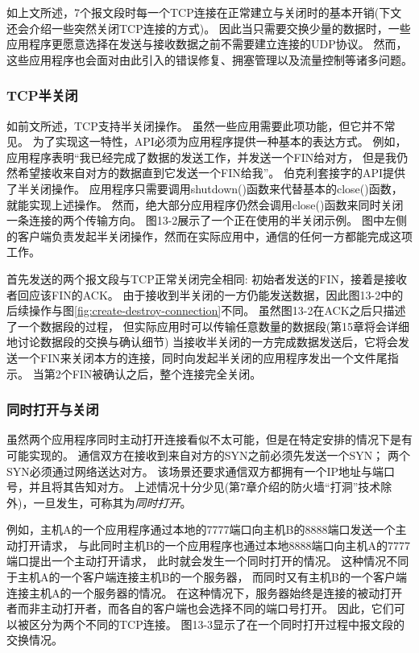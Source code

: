 \documentclass{../main.tex}{subfiles}
\begin{document}
如上文所述，7个报文段时每一个TCP连接在正常建立与关闭时的基本开销(下文还会介绍一些突然关闭TCP连接的方式)。
因此当只需要交换少量的数据时，一些应用程序更愿意选择在发送与接收数据之前不需要建立连接的UDP协议。
然而，这些应用程序也会面对由此引入的错误修复、拥塞管理以及流量控制等诸多问题。


\subsubsection{TCP半关闭}
如前文所述，TCP支持半关闭操作。
虽然一些应用需要此项功能，但它并不常见。
为了实现这一特性，API必须为应用程序提供一种基本的表达方式。
例如，应用程序表明``我已经完成了数据的发送工作，并发送一个FIN给对方，
    但是我仍然希望接收来自对方的数据直到它发送一个FIN给我''。
伯克利套接字的API提供了半关闭操作。
应用程序只需要调用shutdown()函数来代替基本的close()函数，就能实现上述操作。
然而，绝大部分应用程序仍然会调用close()函数来同时关闭一条连接的两个传输方向。
图13-2展示了一个正在使用的半关闭示例。
图中左侧的客户端负责发起半关闭操作，然而在实际应用中，通信的任何一方都能完成这项工作。

首先发送的两个报文段与TCP正常关闭完全相同:
初始者发送的FIN，接着是接收者回应该FIN的ACK。
由于接收到半关闭的一方仍能发送数据，因此图13-2中的后续操作与图\ref{fig:create-destroy-connection}不同。
虽然图13-2在ACK之后只描述了一个数据段的过程，
    但实际应用时可以传输任意数量的数据段(第15章将会详细地讨论数据段的交换与确认细节)
当接收半关闭的一方完成数据发送后，它将会发送一个FIN来关闭本方的连接，同时向发起半关闭的应用程序发出一个文件尾指示。
当第2个FIN被确认之后，整个连接完全关闭。 


\subsubsection{同时打开与关闭}
虽然两个应用程序同时主动打开连接看似不太可能，但是在特定安排的情况下是有可能实现的。
通信双方在接收到来自对方的SYN之前必须先发送一个SYN；
两个SYN必须通过网络送达对方。
该场景还要求通信双方都拥有一个IP地址与端口号，并且将其告知对方。
上述情况十分少见(第7章介绍的防火墙``打洞''技术除外)，一旦发生，可称其为\emph{同时打开}。

例如，主机A的一个应用程序通过本地的7777端口向主机B的8888端口发送一个主动打开请求，
    与此同时主机B的一个应用程序也通过本地8888端口向主机A的7777端口提出一个主动打开请求，
    此时就会发生一个同时打开的情况。
这种情况不同于主机A的一个客户端连接主机B的一个服务器，
    而同时又有主机B的一个客户端连接主机A的一个服务器的情况。
在这种情况下，服务器始终是连接的被动打开者而非主动打开者，而各自的客户端也会选择不同的端口号打开。
因此，它们可以被区分为两个不同的TCP连接。
图13-3显示了在一个同时打开过程中报文段的交换情况。
\end{document}
